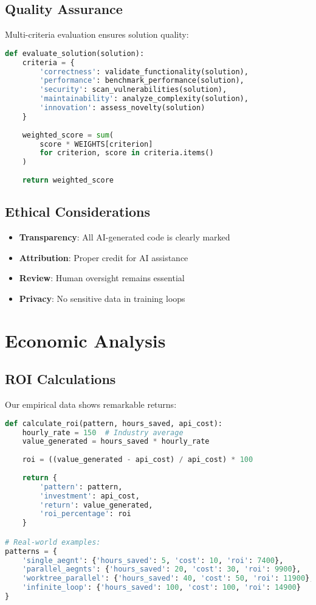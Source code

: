 \documentclass[11pt]{article}
\begin{document}
\subsection{Quality Assurance}

Multi-criteria evaluation ensures solution quality:

\begin{lstlisting}[language=Python]
def evaluate_solution(solution):
    criteria = {
        'correctness': validate_functionality(solution),
        'performance': benchmark_performance(solution),
        'security': scan_vulnerabilities(solution),
        'maintainability': analyze_complexity(solution),
        'innovation': assess_novelty(solution)
    }
    
    weighted_score = sum(
        score * WEIGHTS[criterion] 
        for criterion, score in criteria.items()
    )
    
    return weighted_score
\end{lstlisting}

\subsection{Ethical Considerations}

\begin{itemize}[noitemsep]
\item \textbf{Transparency}: All AI-generated code is clearly marked
\item \textbf{Attribution}: Proper credit for AI assistance
\item \textbf{Review}: Human oversight remains essential
\item \textbf{Privacy}: No sensitive data in training loops
\end{itemize}

\section{Economic Analysis}

\subsection{ROI Calculations}

Our empirical data shows remarkable returns:

\begin{lstlisting}[language=Python]
def calculate_roi(pattern, hours_saved, api_cost):
    hourly_rate = 150  # Industry average
    value_generated = hours_saved * hourly_rate
    
    roi = ((value_generated - api_cost) / api_cost) * 100
    
    return {
        'pattern': pattern,
        'investment': api_cost,
        'return': value_generated,
        'roi_percentage': roi
    }

# Real-world examples:
patterns = {
    'single_aegnt': {'hours_saved': 5, 'cost': 10, 'roi': 7400},
    'parallel_aegnts': {'hours_saved': 20, 'cost': 30, 'roi': 9900},
    'worktree_parallel': {'hours_saved': 40, 'cost': 50, 'roi': 11900},
    'infinite_loop': {'hours_saved': 100, 'cost': 100, 'roi': 14900}
}
\end{lstlisting}
\end{document}
